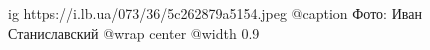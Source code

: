  
 
 
 
 

\ifcmt
  ig https://i.lb.ua/073/36/5c262879a5154.jpeg
	@caption Фото: Иван Станиславский
  @wrap center
  @width 0.9
\fi

